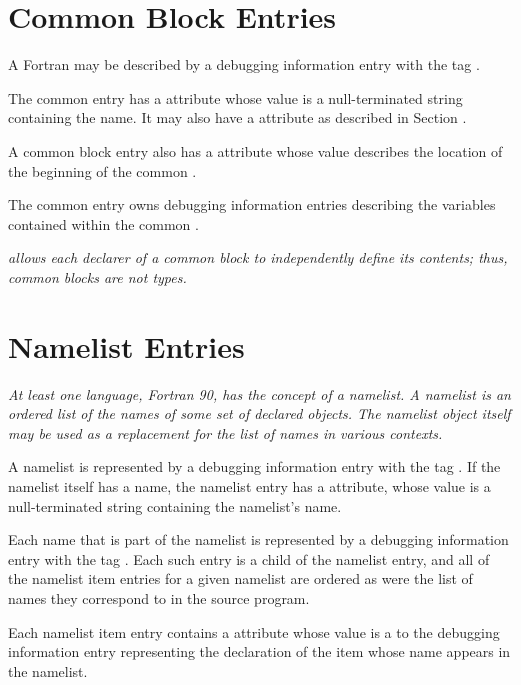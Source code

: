 \section{Common Block Entries}
\label{chap:commonblockentries}
A Fortran 
may 
be described by a debugging information entry with the 
tag \DWTAGcommonblockTARG. 

The common  
entry has a \DWATname{} attribute
whose value is a null-terminated string containing the
name. It may also have a \DWATlinkagename{} attribute as described 
in Section . 

A common block entry also has a \DWATlocation{} attribute
whose value describes the
location of the beginning of the common . 

The common
 entry owns debugging information entries describing
the variables contained within the common .

\textit{ allows each declarer of a common block 
to independently define its contents; thus, common blocks are not types.}

\section{Namelist Entries}
\label{chap:namelistentries}
\textit{At least one language, Fortran 90, has the concept of a
namelist. A namelist is an ordered list of the names of some
set of declared objects. The namelist object itself may be used
as a replacement for the list of names in various contexts.}

A namelist is represented by a debugging information entry
with the tag \DWTAGnamelistTARG.
If the namelist itself has a
name, the namelist entry has a \DWATname{} attribute,
whose value is a null-terminated
string containing the namelist\textquoteright{}s
name.

Each\hypertarget{chap:DWATnamelistitemnamelistitem}{}
name that is part of the namelist is represented
by a debugging information entry with the tag
\DWTAGnamelistitemTARG. 
Each such entry is a child of the
namelist entry, and all of the 
namelist item entries for a
given namelist are ordered as were the list of names they
correspond to in the source program.

Each namelist item entry contains a 
\DWATnamelistitemDEFN{} attribute
whose 
value is a  to the debugging
information entry representing the declaration of the item
whose name appears in the namelist.

